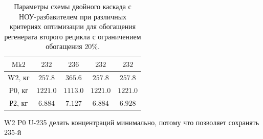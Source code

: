 \begin{table}
\begin{tabular}{ccccc}
        $\text{Mk2}$ & $232$ & $236$ & $232$ & $232$\\ \hline
        $\text{W2, кг}$ & $257.8$ & $365.6$ & $257.8$ & $257.8$\\ \hline
        $\text{P0, кг}$ & $1221.0$ & $1113.0$ & $1221.0$ & $1221.0$\\ \hline
        $\text{Р2, кг}$ & $6.884$ & $7.127$ & $6.884$ & $6.928$ \\ \hline
    \end{tabular}
\caption{Параметры схемы двойного каскада с НОУ-разбавителем при различных критериях оптимизации для обогащения регенерата второго рецикла с ограничением обогащения 20\%.{\label{2opt2_20}}}
\end{table}


W2 P0 U-235 делать концентраций минимально, потому что позволяет сохранять 235-й



